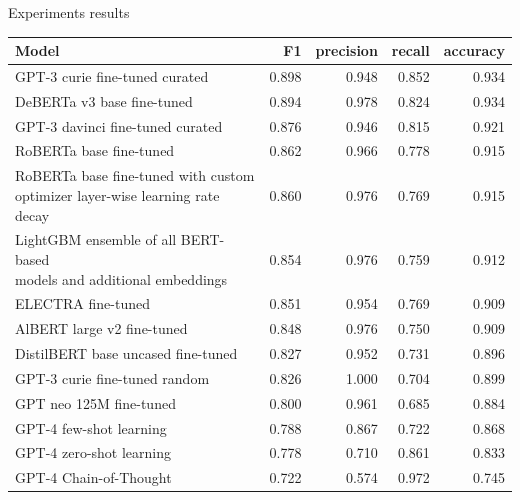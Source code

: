 \documentclass[aspectratio=149]{beamer}
\begin{document}


\begin{frame}{Experiments results}
\fontsize{9pt}{10pt}\selectfont
\begin{table}[!htb]
    \centering
    \label{tab:results}
    \begin{tabular}{lrrrr}
        \toprule
        Model                              & F1    & precision & recall & accuracy \\
        \midrule
        GPT-3 curie fine-tuned curated     & 0.898 & 0.948     & 0.852  & 0.934    \\
        DeBERTa v3 base fine-tuned         & 0.894 & 0.978     & 0.824  & 0.934    \\
        GPT-3 davinci fine-tuned curated   & 0.876 & 0.946     & 0.815  & 0.921    \\
        RoBERTa base fine-tuned            & 0.862 & 0.966     & 0.778  & 0.915    \\
        \makecell[l]{RoBERTa base fine-tuned with custom                           \\optimizer layer-wise learning rate decay} & 0.860 &      0.976 &   0.769 &     0.915 \\
        \makecell[l]{LightGBM ensemble of all BERT-based                           \\models and additional embeddings} & 0.854 &      0.976 &   0.759 &     0.912 \\
        ELECTRA fine-tuned                 & 0.851 & 0.954     & 0.769  & 0.909    \\
        AlBERT large v2 fine-tuned         & 0.848 & 0.976     & 0.750  & 0.909    \\
        DistilBERT base uncased fine-tuned & 0.827 & 0.952     & 0.731  & 0.896    \\
        GPT-3 curie fine-tuned random      & 0.826 & 1.000     & 0.704  & 0.899    \\
        GPT neo 125M fine-tuned            & 0.800 & 0.961     & 0.685  & 0.884    \\
        GPT-4 few-shot learning            & 0.788 & 0.867     & 0.722  & 0.868    \\
        GPT-4 zero-shot learning           & 0.778 & 0.710     & 0.861  & 0.833    \\
        GPT-4 Chain-of-Thought             & 0.722 & 0.574     & 0.972  & 0.745    \\
        \bottomrule
    \end{tabular}

\end{table}
\end{frame}
\end{document}
